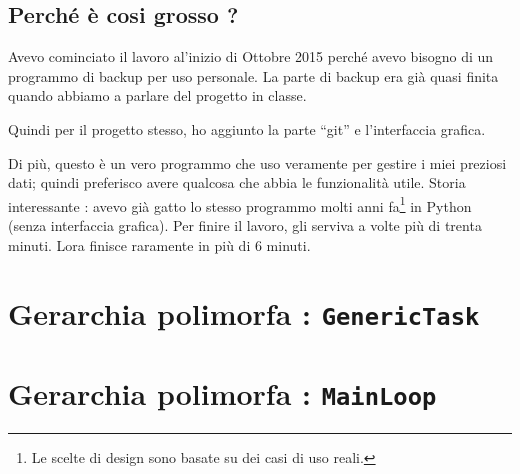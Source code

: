 \documentclass[a4paper,12pt]{article}
\newcommand{\info}[1]{\texttt{#1}}
\begin{document}
\subsection{Perché è cosi grosso ?}

Avevo cominciato il lavoro al'inizio di Ottobre 2015 perché avevo bisogno di un programmo di backup per uso personale. La parte di backup era già quasi finita quando abbiamo a parlare del progetto in classe.

Quindi per il progetto stesso, ho aggiunto la parte ``git'' e l'interfaccia grafica.

Di più, questo è un vero programmo che uso veramente per gestire i miei preziosi dati; quindi preferisco avere qualcosa che abbia le funzionalità utile. Storia interessante : avevo già gatto lo stesso programmo molti anni fa\footnote{Le scelte di design sono basate su dei casi di uso reali.} in Python (senza interfaccia grafica). Per finire il lavoro, gli serviva a volte più di trenta minuti. Lora finisce raramente in più di 6 minuti.

\section{Gerarchia polimorfa : \info{GenericTask}}
\label{SECooVDGXooHTFdPE}

\section{Gerarchia polimorfa : \info{MainLoop}}
\end{document}
